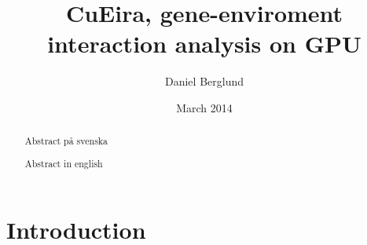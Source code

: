 \documentclass[10pt,a4paper]{article}
\title{CuEira, gene-enviroment interaction analysis on GPU}
\author{Daniel Berglund}
\date{March 2014}
\makeatletter
\newcommand\ackname{Acknowledgements}
\newenvironment{acknowledgements}{
      \titlepage
      \null\vfil
      \@beginparpenalty\@lowpenalty
      \begin{center}%
        \bfseries \ackname
        \@endparpenalty\@M
      \end{center}}%
     {\par\vfil\null\endtitlepage}
\newenvironment{acknowledgements}{
      \if@twocolumn
        \section*{\abstractname}
      \else
        \small
        \begin{center}
          {\bfseries \ackname\vspace{-.5em}\vspace{\z@}}
        \end{center}
        \quotation
      \fi}
      {\if@twocolumn\else\endquotation\fi}
\makeatother
\begin{document}
\maketitle

\clearpage
{}
\begin{abstract}
Abstract på svenska
\end{abstract}
\clearpage
{}
\begin{abstract}
Abstract in english
\end{abstract}
\clearpage
\tableofcontents
\newpage

\section{Introduction}


\end{document}
